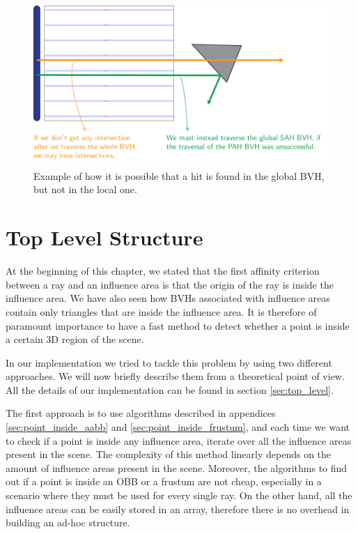 \documentclass{PoliMi_MasterThesis}
\begin{document}
\begin{figure}[H]
    \centering
    \includegraphics[width=\textwidth*\real{0.7}]{Images/outside_area.png}
    \caption{Example of how it is possible that a hit is found in the global BVH, but not in the local one.}
    \label{fig:outside_area}
\end{figure}

\section{Top Level Structure} \label{sec:top_level_structure}
At the beginning of this chapter, we stated that the first affinity criterion between a ray and an influence area is that the origin of the ray is inside the influence area. We have also seen how BVHs associated with influence areas contain only triangles that are inside the influence area. It is therefore of paramount importance to have a fast method to detect whether a point is inside a certain 3D region of the scene. 

In our implementation we tried to tackle this problem by using two different approaches. We will now briefly describe them from a theoretical point of view. All the details of our implementation can be found in section \ref{sec:top_level}.

The first approach is to use algorithms described in appendices \ref{sec:point_inside_aabb} and \ref{sec:point_inside_frustum}, and each time we want to check if a point is inside any influence area, iterate over all the influence areas present in the scene. The complexity of this method linearly depends on the amount of influence areas present in the scene. Moreover, the algorithms to find out if a point is inside an OBB or a frustum are not cheap, especially in a scenario where they must be used for every single ray. On the other hand, all the influence areas can be easily stored in an array, therefore there is no overhead in building an ad-hoc structure.
\end{document}
